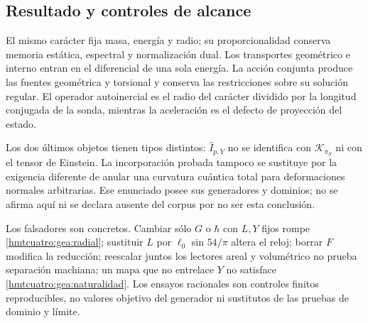 \subsection{Resultado y controles de alcance}
\label{hmtcuatro:gea:conclusion}

El mismo carácter fija masa, energía y radio; su proporcionalidad
conserva memoria estática, espectral y normalización dual.
Los transportes geométrico e interno entran en el diferencial
de una sola energía. La acción conjunta produce las fuentes
geométrica y torsional y conserva las restricciones sobre su
solución regular. El operador autoinercial es el radio del
carácter dividido por la longitud conjugada de la sonda,
mientras la aceleración es el defecto de proyección del estado.

Los dos últimos objetos tienen tipos distintos:
$\widehat I_{p,Y}$ no se identifica con $\mathcal K_{\pi_S}$
ni con el tensor de Einstein. La incorporación probada tampoco
se sustituye por la exigencia diferente de anular una curvatura
cuántica total para deformaciones normales arbitrarias.
Ese enunciado posee sus generadores y dominios; no se afirma aquí
ni se declara ausente del corpus por no ser esta conclusión.

Los falsadores son concretos. Cambiar sólo $G$ o $\hbar$ con
$L,Y$ fijos rompe \eqref{hmtcuatro:gea:radial}; sustituir
$L$ por $\ell_0$ sin $54/\pi$ altera el reloj; borrar $F$
modifica la reducción; reescalar juntos los lectores areal y
volumétrico no prueba separación machiana; un mapa que no
entrelace $Y$ no satisface \eqref{hmtcuatro:gea:naturalidad}.
Los ensayos racionales son controles finitos reproducibles,
no valores objetivo del generador ni sustitutos de las pruebas
de dominio y límite.
